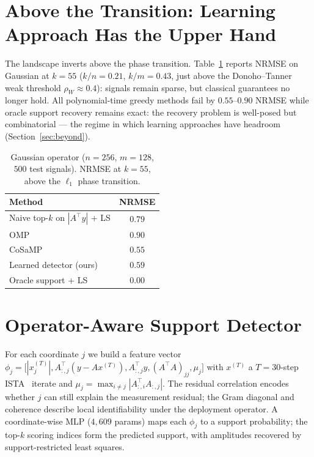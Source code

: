 \documentclass[conference,10pt]{IEEEtran}
\begin{document}
\section{Above the Transition: Learning Approach Has the Upper Hand}
The landscape inverts above the phase transition.
Table~\ref{tab:main} reports NRMSE on Gaussian at $k{=}55$
($k/n{=}0.21$, $k/m{=}0.43$, just above the Donoho--Tanner weak
threshold $\rho_W{\approx}0.4$): signals remain sparse, but classical
guarantees no longer hold. All polynomial-time greedy methods fail by
$0.55$--$0.90$ NRMSE while oracle support recovery remains exact:
the recovery problem is well-posed but combinatorial --- the regime
in which learning approaches have headroom (Section~\ref{sec:beyond}).

\begin{table}[t]
\centering
\caption{Gaussian operator ($n{=}256$, $m{=}128$, $500$ test signals).
NRMSE at $k{=}55$, above the $\ell_1$ phase transition.}
\label{tab:main}
\vspace{-4pt}
\begin{tabular}{lc}
\toprule
\textbf{Method} & \textbf{NRMSE} \\
\midrule
Naive top-$k$ on $|A^{\!\top}\!y|$ + LS & $0.79$ \\
OMP                                     & $0.90$ \\
CoSaMP                                  & $\mathbf{0.55}$ \\
Learned detector (ours)                 & $0.59$ \\
Oracle support + LS                     & $\mathbf{0.00}$ \\
\bottomrule
\end{tabular}
\vspace{-6pt}
\end{table}

\section{Operator-Aware Support Detector}
For each coordinate $j$ we build a feature vector
$\phi_j = \bigl[|x^{(T)}_j|,
A_{:,j}^{\!\top}(y {-} A x^{(T)}),
A_{:,j}^{\!\top} y,
(A^{\!\top}\!A)_{jj},
\mu_j\bigr]$
with $x^{(T)}$ a $T{=}30$-step ISTA~\cite{ista} iterate and $\mu_j {=}
\max_{i\neq j}|A_{:,i}^{\!\top}\! A_{:,j}|$. The residual correlation
encodes whether $j$ can still explain the measurement residual; the
Gram diagonal and coherence describe local identifiability under the
deployment operator. A coordinate-wise MLP ($4{,}609$ params) maps
each $\phi_j$ to a support probability; the top-$k$ scoring indices
form the predicted support, with amplitudes recovered by
support-restricted least squares.
\end{document}
